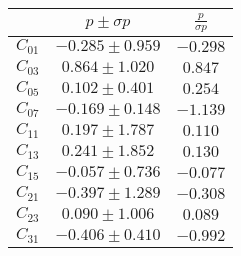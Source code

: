 
\begin{tabular}{c|c|c}
& $p \pm \sigma p$ & $\frac{p}{\sigma p}$ \\ \hline
$C_{01}$&$-0.285\pm0.959$&$-0.298$\\ 
$C_{03}$&$0.864\pm1.020$&$0.847$\\ 
$C_{05}$&$0.102\pm0.401$&$0.254$\\ 
$C_{07}$&$-0.169\pm0.148$&$-1.139$\\ 
$C_{11}$&$0.197\pm1.787$&$0.110$\\ 
$C_{13}$&$0.241\pm1.852$&$0.130$\\ 
$C_{15}$&$-0.057\pm0.736$&$-0.077$\\ 
$C_{21}$&$-0.397\pm1.289$&$-0.308$\\ 
$C_{23}$&$0.090\pm1.006$&$0.089$\\ 
$C_{31}$&$-0.406\pm0.410$&$-0.992$\\ 
\end{tabular}
